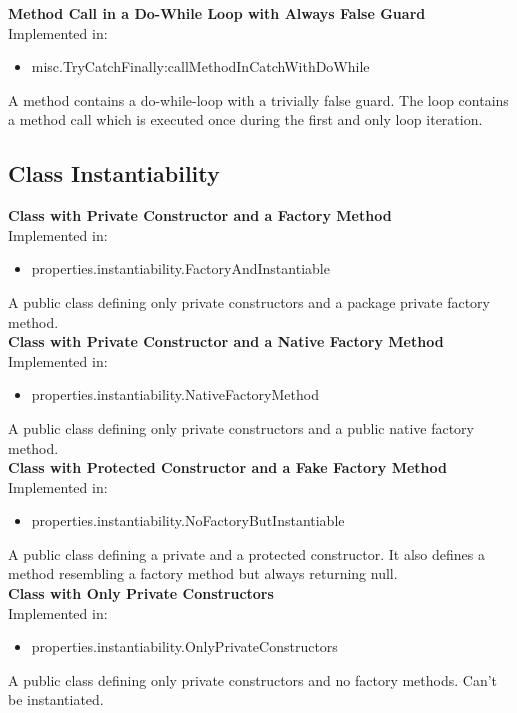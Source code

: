 \documentclass{article}
\begin{document}
\noindent
\textbf{Method Call in a Do-While Loop with Always False Guard}\\
Implemented in: 
\begin{itemize}
    \item misc.TryCatchFinally:callMethodInCatchWithDoWhile
\end{itemize}
A method contains a do-while-loop with a trivially false guard. The loop contains a method call which is executed once during the first and only loop iteration.\\

    
\subsection{Class Instantiability}

\textbf{Class with Private Constructor and a Factory Method}\\
Implemented in: 
\begin{itemize}
    \item properties.instantiability.FactoryAndInstantiable
\end{itemize}
A public class defining only private constructors and a package private factory method.\\

\noindent
\textbf{Class with Private Constructor and a Native Factory Method}\\
Implemented in: 
\begin{itemize}
    \item properties.instantiability.NativeFactoryMethod
\end{itemize}
A public class defining only private constructors and a public native factory method.\\

\noindent
\textbf{Class with Protected Constructor and a Fake Factory Method}\\
Implemented in: 
\begin{itemize}
    \item properties.instantiability.NoFactoryButInstantiable
\end{itemize}
A public class defining a private and a protected constructor. It also defines a method resembling a factory method but always returning null.\\

\noindent
\textbf{Class with Only Private Constructors}\\
Implemented in: 
\begin{itemize}
    \item properties.instantiability.OnlyPrivateConstructors
\end{itemize}
A public class defining only private constructors and no factory methods. Can't be instantiated.\\
\end{document}
